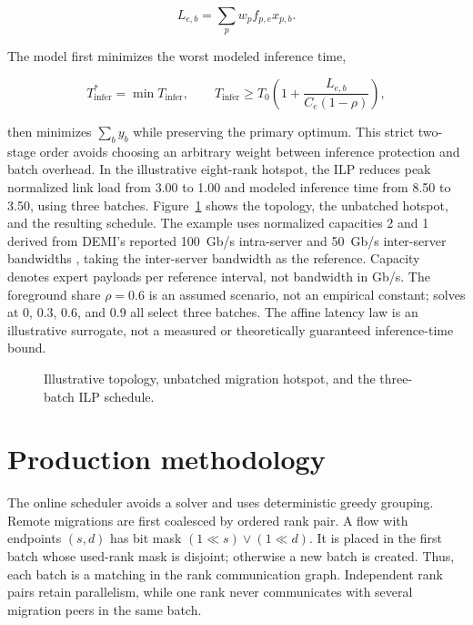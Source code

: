 \documentclass[10pt,a4paper]{article}
\begin{document}
\begin{equation}
  L_{e,b}=\sum_p w_p f_{p,e}x_{p,b}.
\end{equation}

The model first minimizes the worst modeled inference time,

\begin{equation}
  T_{\mathrm{infer}}^*=\min T_{\mathrm{infer}}, \qquad
  T_{\mathrm{infer}}\ge
  T_0\left(1+\frac{L_{e,b}}{C_e(1-\rho)}\right),
\end{equation}

then minimizes $\sum_b y_b$ while preserving the primary optimum. This strict
two-stage order avoids choosing an arbitrary weight between inference protection
and batch overhead. In the illustrative eight-rank hotspot, the ILP reduces peak
normalized link load from 3.00 to 1.00 and modeled inference time from
8.50 to 3.50, using three batches. Figure~\ref{fig:summary-ilp} shows the
topology, the unbatched hotspot, and the resulting schedule.
The example uses normalized capacities 2 and 1 derived from DEMI's reported
100~Gb/s intra-server and 50~Gb/s inter-server bandwidths
\cite{zhang2025demi}, taking the inter-server bandwidth as the reference.
Capacity denotes expert payloads per reference interval,
not bandwidth in Gb/s. The foreground share $\rho=0.6$ is an assumed scenario,
not an empirical constant; solves at 0, 0.3, 0.6, and 0.9 all select three
batches. The affine latency law is an illustrative surrogate, not a measured
or theoretically guaranteed inference-time bound.

\begin{figure}[t]
  \centering
  
  \caption{Illustrative topology, unbatched migration hotspot, and the
  three-batch ILP schedule.}
  \label{fig:summary-ilp}
\end{figure}

\section{Production methodology}

The online scheduler avoids a solver and uses deterministic greedy grouping.
Remote migrations are first coalesced by ordered rank pair. A flow with endpoints
$(s,d)$ has bit mask $(1\ll s)\lor(1\ll d)$. It is placed in the first batch whose
used-rank mask is disjoint; otherwise a new batch is created. Thus, each batch is
a matching in the rank communication graph. Independent rank pairs retain
parallelism, while one rank never communicates with several migration peers in
the same batch.
\end{document}
